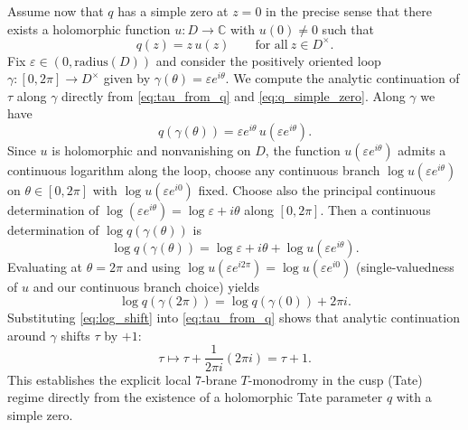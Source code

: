 \documentclass[11pt]{article}
\theoremstyle{remark}
\begin{document}
Assume now that $q$ has a simple zero at $z=0$ in the precise sense that there exists a holomorphic function $u:D\to\mathbb{C}$ with $u(0)\neq 0$ such that
\begin{equation}\label{eq:q_simple_zero}
q(z)=z\,u(z)\qquad\text{for all}\ z\in D^\times.
\end{equation}
Fix $\varepsilon\in(0,\mathrm{radius}(D))$ and consider the positively oriented loop $\gamma:[0,2\pi]\to D^\times$ given by $\gamma(\theta)=\varepsilon e^{i\theta}$. We compute the analytic continuation of $\tau$ along $\gamma$ directly from \eqref{eq:tau_from_q} and \eqref{eq:q_simple_zero}. Along $\gamma$ we have
\begin{equation}\label{eq:q_along_loop}
q(\gamma(\theta))=\varepsilon e^{i\theta}\,u(\varepsilon e^{i\theta}).
\end{equation}
Since $u$ is holomorphic and nonvanishing on $D$, the function $u(\varepsilon e^{i\theta})$ admits a continuous logarithm along the loop, choose any continuous branch $\log u(\varepsilon e^{i\theta})$ on $\theta\in[0,2\pi]$ with $\log u(\varepsilon e^{i0})$ fixed. Choose also the principal continuous determination of $\log(\varepsilon e^{i\theta})=\log\varepsilon+i\theta$ along $[0,2\pi]$. Then a continuous determination of $\log q(\gamma(\theta))$ is
\begin{equation}\label{eq:logq_branch}
\log q(\gamma(\theta))=\log\varepsilon+i\theta+\log u(\varepsilon e^{i\theta}).
\end{equation}
Evaluating at $\theta=2\pi$ and using $\log u(\varepsilon e^{i2\pi})=\log u(\varepsilon e^{i0})$ (single-valuedness of $u$ and our continuous branch choice) yields
\begin{equation}\label{eq:log_shift}
\log q(\gamma(2\pi))=\log q(\gamma(0))+2\pi i.
\end{equation}
Substituting \eqref{eq:log_shift} into \eqref{eq:tau_from_q} shows that analytic continuation around $\gamma$ shifts $\tau$ by $+1$:
\begin{equation}\label{eq:T_monodromy_tau}
\tau\longmapsto \tau+\frac{1}{2\pi i}(2\pi i)=\tau+1.
\end{equation}
This establishes the explicit local 7-brane $T$-monodromy in the cusp (Tate) regime directly from the existence of a holomorphic Tate parameter $q$ with a simple zero.
\end{document}
